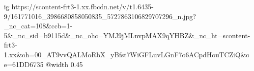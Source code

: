  
 
 
 
 

\ifcmt
  ig https://scontent-frt3-1.xx.fbcdn.net/v/t1.6435-9/161771016_3986680858050835_5727863106829707296_n.jpg?_nc_cat=108&ccb=1-5&_nc_sid=b9115d&_nc_ohc=YMJ9jMLnvpMAX9qYHBZ&_nc_ht=scontent-frt3-1.xx&oh=00_AT9vvQALMoRbX_yBfst7WiGFLuvLGnF7o6ACpdHouTCZiQ&oe=61DD6735
  @width 0.45
\fi
